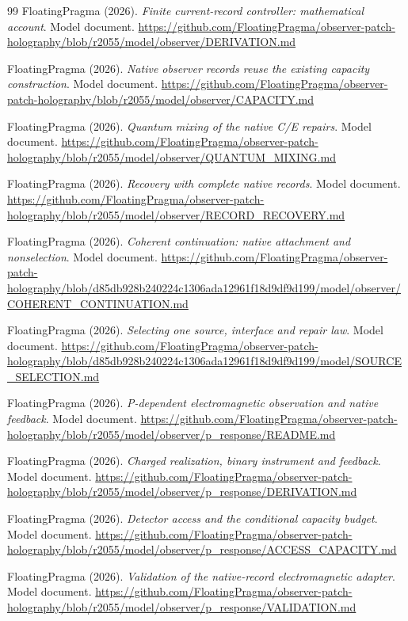 \documentclass[11pt]{article}
\theoremstyle{definition}
\theoremstyle{remark}
\theoremstyle{plain}
\begin{document}
{\begin{thebibliography}{99}
FloatingPragma (2026). \emph{Finite current-record controller: mathematical
account}. Model document.
\url{https://github.com/FloatingPragma/observer-patch-holography/blob/r2055/model/observer/DERIVATION.md}

FloatingPragma (2026). \emph{Native observer records reuse the existing capacity
construction}. Model document.
\url{https://github.com/FloatingPragma/observer-patch-holography/blob/r2055/model/observer/CAPACITY.md}

FloatingPragma (2026). \emph{Quantum mixing of the native C/E repairs}. Model
document.
\url{https://github.com/FloatingPragma/observer-patch-holography/blob/r2055/model/observer/QUANTUM_MIXING.md}

FloatingPragma (2026). \emph{Recovery with complete native records}. Model
document.
\url{https://github.com/FloatingPragma/observer-patch-holography/blob/r2055/model/observer/RECORD_RECOVERY.md}

FloatingPragma (2026). \emph{Coherent continuation: native attachment and
nonselection}. Model document.
\url{https://github.com/FloatingPragma/observer-patch-holography/blob/d85db928b240224c1306ada12961f18d9df9d199/model/observer/COHERENT_CONTINUATION.md}

FloatingPragma (2026). \emph{Selecting one source, interface and repair law}.
Model document.
\url{https://github.com/FloatingPragma/observer-patch-holography/blob/d85db928b240224c1306ada12961f18d9df9d199/model/SOURCE_SELECTION.md}

FloatingPragma (2026). \emph{P-dependent electromagnetic observation and native
feedback}. Model document.
\url{https://github.com/FloatingPragma/observer-patch-holography/blob/r2055/model/observer/p_response/README.md}

FloatingPragma (2026). \emph{Charged realization, binary instrument and
feedback}. Model document.
\url{https://github.com/FloatingPragma/observer-patch-holography/blob/r2055/model/observer/p_response/DERIVATION.md}

FloatingPragma (2026). \emph{Detector access and the conditional capacity
budget}. Model document.
\url{https://github.com/FloatingPragma/observer-patch-holography/blob/r2055/model/observer/p_response/ACCESS_CAPACITY.md}

FloatingPragma (2026). \emph{Validation of the native-record electromagnetic
adapter}. Model document.
\url{https://github.com/FloatingPragma/observer-patch-holography/blob/r2055/model/observer/p_response/VALIDATION.md}


\end{thebibliography}}
\end{document}
